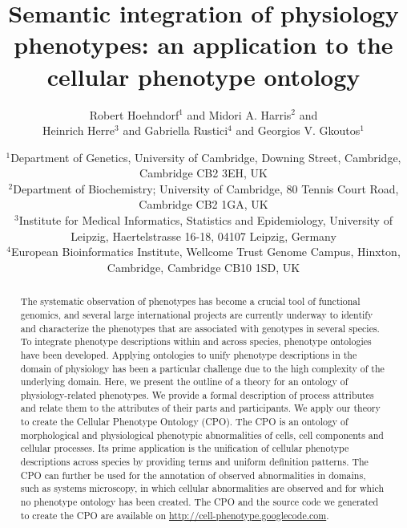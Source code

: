 \documentclass[12pt]{article}
\begin{document}

\title{Semantic integration of physiology phenotypes: an application
  to the cellular phenotype ontology}

\author{Robert Hoehndorf$^1$ and Midori
  A. Harris$^2$ and\\Heinrich Herre$^3$ and Gabriella Rustici$^4$ and
  Georgios V. Gkoutos$^{1}$}

\date{$^{1}$Department of Genetics, University of Cambridge,
  Downing Street, Cambridge, Cambridge CB2 3EH, UK\\
  $^{2}$Department of Biochemistry; University of Cambridge, 80 Tennis
  Court Road, Cambridge CB2 1GA, UK\\
  $^{3}$Institute for Medical Informatics, Statistics and
  Epidemiology, University of Leipzig, Haertelstrasse 16-18, 04107
  Leipzig, Germany\\
  $^{4}$European Bioinformatics Institute, Wellcome Trust Genome
  Campus, Hinxton, Cambridge, Cambridge CB10 1SD, UK}

\maketitle
 
\begin{abstract}
  The systematic observation of phenotypes has become a crucial tool
  of functional genomics, and several large international projects are
  currently underway to identify and characterize the phenotypes that
  are associated with genotypes in several species. To integrate
  phenotype descriptions within and across species, phenotype
  ontologies have been developed. Applying ontologies to unify
  phenotype descriptions in the domain of physiology has been a
  particular challenge due to the high complexity of the underlying
  domain.  Here, we present the outline of a theory for an ontology of
  physiology-related phenotypes. We provide a formal description of
  process attributes and relate them to the attributes of their parts
  and participants. We apply our theory to create the Cellular
  Phenotype Ontology (CPO). The CPO is an ontology of morphological
  and physiological phenotypic abnormalities of cells, cell components
  and cellular processes. Its prime application is the unification of
  cellular phenotype descriptions across species by providing terms
  and uniform definition patterns. The CPO can further be used for the
  annotation of observed abnormalities in domains, such as systems
  microscopy, in which cellular abnormalities are observed and for
  which no phenotype ontology has been created.  The CPO and the
  source code we generated to create the CPO are available on
  \url{http://cell-phenotype.googlecode.com}.
\end{abstract}
\end{document}
